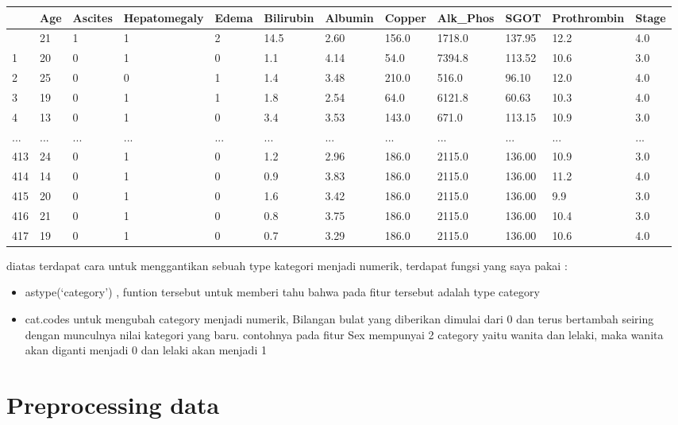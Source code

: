 \documentclass[
  letterpaper,
]{krantz}
\begin{document}
\begin{longtable}[]{@{}llllllllllll@{}}
\toprule\noalign{}
& Age & Ascites & Hepatomegaly & Edema & Bilirubin & Albumin & Copper &
Alk\_Phos & SGOT & Prothrombin & Stage \\
\midrule\noalign{}
\endhead
\bottomrule\noalign{}
\endlastfoot
0 & 21 & 1 & 1 & 2 & 14.5 & 2.60 & 156.0 & 1718.0 & 137.95 & 12.2 &
4.0 \\
1 & 20 & 0 & 1 & 0 & 1.1 & 4.14 & 54.0 & 7394.8 & 113.52 & 10.6 & 3.0 \\
2 & 25 & 0 & 0 & 1 & 1.4 & 3.48 & 210.0 & 516.0 & 96.10 & 12.0 & 4.0 \\
3 & 19 & 0 & 1 & 1 & 1.8 & 2.54 & 64.0 & 6121.8 & 60.63 & 10.3 & 4.0 \\
4 & 13 & 0 & 1 & 0 & 3.4 & 3.53 & 143.0 & 671.0 & 113.15 & 10.9 & 3.0 \\
... & ... & ... & ... & ... & ... & ... & ... & ... & ... & ... & ... \\
413 & 24 & 0 & 1 & 0 & 1.2 & 2.96 & 186.0 & 2115.0 & 136.00 & 10.9 &
3.0 \\
414 & 14 & 0 & 1 & 0 & 0.9 & 3.83 & 186.0 & 2115.0 & 136.00 & 11.2 &
4.0 \\
415 & 20 & 0 & 1 & 0 & 1.6 & 3.42 & 186.0 & 2115.0 & 136.00 & 9.9 &
3.0 \\
416 & 21 & 0 & 1 & 0 & 0.8 & 3.75 & 186.0 & 2115.0 & 136.00 & 10.4 &
3.0 \\
417 & 19 & 0 & 1 & 0 & 0.7 & 3.29 & 186.0 & 2115.0 & 136.00 & 10.6 &
4.0 \\
\end{longtable}

diatas terdapat cara untuk menggantikan sebuah type kategori menjadi
numerik, terdapat fungsi yang saya pakai :

\begin{itemize}
\item
  astype(`category') , funtion tersebut untuk memberi tahu bahwa pada
  fitur tersebut adalah type category
\item
  cat.codes untuk mengubah category menjadi numerik, Bilangan bulat yang
  diberikan dimulai dari 0 dan terus bertambah seiring dengan munculnya
  nilai kategori yang baru. contohnya pada fitur Sex mempunyai 2
  category yaitu wanita dan lelaki, maka wanita akan diganti menjadi 0
  dan lelaki akan menjadi 1
\end{itemize}


\hypertarget{preprocessing-data}{%
\chapter*{Preprocessing data}\label{preprocessing-data}}
\end{document}
